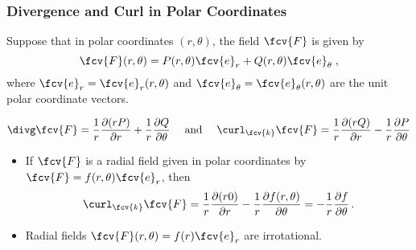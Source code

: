 \begin{frame}
\small
  \frametitle{Divergence and Curl in Polar Coordinates}

Suppose that in polar coordinates $(r, \theta)$, the field $\fcv{F}$ is given by
%
$$\fcv{F}(r, \theta) = P(r, \theta) \fcv{e}_{r} + Q(r, \theta) \fcv{e}_{\theta} \; ,$$
%
where $\fcv{e}_{r} = \fcv{e}_{r}(r, \theta)$ and $\fcv{e}_{\theta}=\fcv{e}_{\theta}(r, \theta)$ are the unit polar coordinate vectors.

%
$$\divg \fcv{F} =  \frac{1}{r} \frac{\partial (r P)}{\partial r} + \frac{1}{r} \frac{\partial Q}{\partial \theta} \quad \text{ and } \quad
   \curl_{\fcv{k}} \fcv{F} =  \frac{1}{r} \frac{\partial (r Q)}{\partial r} - \frac{1}{r} \frac{\partial P}{\partial \theta}
$$

\begin{itemize}
  \item \pause If $\fcv{F}$ is a radial field given in polar coordinates by $\fcv{F} = f(r,\theta)\fcv{e}_r$, then
%
$$\curl_{\fcv{k}} \fcv{F} = \frac{1}{r} \frac{\partial (r 0)}{\partial r} - \frac{1}{r}\frac{\partial f(r,\theta)}{\partial \theta} = - \frac{1}{r} \frac{\partial f}{\partial \theta} \, .$$
\item \pause Radial fields $\fcv{F}(r,\theta) = f(r)\fcv{e}_r$ are irrotational.
\end{itemize}

\end{frame}